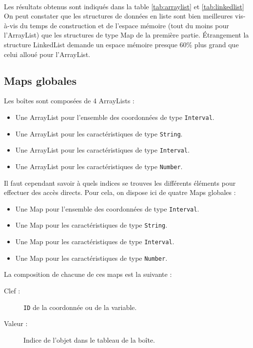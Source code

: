 \paragraph{}Les résultats obtenus sont indiqués dans la table \ref{tab:arraylist} et \ref{tab:linkedlist}
On peut constater que les structures de données en liste sont bien meilleures vis-à-vis du temps de construction et de l'espace mémoire (tout du moins pour l'ArrayList) que les structures de type Map de la première partie. Étrangement la structure LinkedList demande un espace mémoire presque 60\% plus grand que celui alloué pour l'ArrayList.


\subsection{Maps globales}
Les boîtes sont composées  de 4 ArrayLists : 
\begin{itemize}
  \item Une ArrayList pour l'ensemble des coordonnées de type \verb+Interval+.
  \item Une ArrayList pour les caractéristiques de type \verb+String+.
  \item Une ArrayList pour les caractéristiques de type \verb+Interval+.
  \item Une ArrayList pour les caractéristiques de type \verb+Number+.
\end{itemize}
Il faut cependant savoir à quels indices se trouves les différents éléments pour effectuer des accès directs. Pour cela, on dispose ici de quatre Maps globales :
\begin{itemize}
  \item Une Map pour l'ensemble des coordonnées de type \verb+Interval+.
  \item Une Map pour les caractéristiques de type \verb+String+.
  \item Une Map pour les caractéristiques de type \verb+Interval+.
  \item Une Map pour les caractéristiques de type \verb+Number+.
\end{itemize}
La composition de chacune de ces maps est la suivante :  
\begin{description}
 \item[Clef :]
\verb+ID+ de la coordonnée ou de la variable.
\item[Valeur :]
Indice de l'objet dans le tableau de la boîte.
\end{description}


